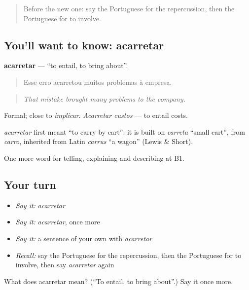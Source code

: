 \begin{quote}
Before the new one: say the Portuguese for the repercussion, then the Portuguese for to involve.
\end{quote}

\subsection*{You'll want to know: acarretar}
\textbf{acarretar} — \textquotedblleft{}to entail, to bring about\textquotedblright{}.

\begin{quote}
Esse erro acarretou muitos problemas à empresa.
\end{quote}

\begin{quote}
\emph{That mistake brought many problems to the company.}
\end{quote}

Formal; close to \emph{implicar}. \emph{Acarretar custos} — to entail costs.

\begin{cousinweb}
\emph{acarretar} first meant \textquotedblleft{}to carry by cart\textquotedblright{}: it is built on \emph{carreta} \textquotedblleft{}small cart\textquotedblright{}, from \emph{carro}, inherited from Latin \emph{carrus} \textquotedblleft{}a wagon\textquotedblright{} (Lewis \& Short).
\end{cousinweb}

\begin{grammarlens}[title={What you've built}]
One more word for telling, explaining and describing at B1.
\end{grammarlens}

\subsection*{Your turn}
\begin{itemize}
\raggedright
  \item \emph{Say it:} \emph{acarretar}
  \item \emph{Say it:} \emph{acarretar}, once more
  \item \emph{Say it:} a sentence of your own with \emph{acarretar}
  \item \emph{Recall:} say the Portuguese for the repercussion, then the Portuguese for to involve, then say \emph{acarretar} again
\end{itemize}

\begin{tcolorbox}[breakable,colback=teal!4,colframe=teal!35!black,title={Before you move on}]
What does acarretar mean? (\textquotedblleft{}To entail, to bring about\textquotedblright{}.) Say it once more.
\end{tcolorbox}
